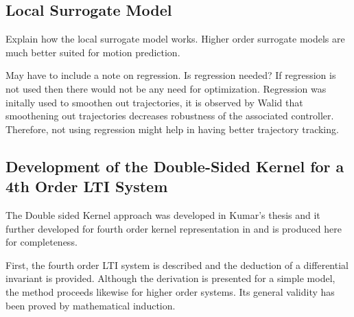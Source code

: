 \documentclass{article}
\begin{document}
\subsection{Local Surrogate Model}
Explain how the local surrogate model works. Higher order surrogate models are much better suited for motion prediction. 

May have to include a note on regression. 
Is regression needed? If regression is not used then there would not be any need for optimization. Regression was initally used to smoothen out trajectories, it is observed by Walid that smoothening out trajectories decreases robustness of the associated controller. Therefore, not using regression might help in having better trajectory tracking. 


\subsection{Development of the Double-Sided Kernel for a 4th Order LTI System\cite{Shaunak_thesis}}
The Double sided Kernel approach was developed in Kumar's thesis and it further developed for fourth order kernel representation in \cite{Shaunak_thesis} and is produced here for completeness. 

First, the fourth order LTI system is described and the deduction of a differential invariant is provided. Although the derivation is presented for a simple model, the method proceeds likewise for higher order systems. Its general validity has been proved by mathematical induction.
\end{document}

